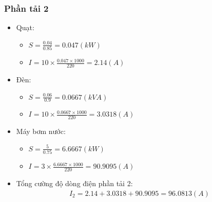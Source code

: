         \subsubsection{Phần tải 2}
            \begin{itemize}
                \item Quạt:
                    \begin{itemize}
                        \item $S = \frac{0.04}{0.85} = 0.047 (kW)$
                        \item $I = 10 \times \frac{0.047 \times 1000}{220} = 2.14 (A)$
                    \end{itemize}
                \item Đèn:
                    \begin{itemize}
                        \item $S = \frac{0.06}{0.9} = 0.0667 (kVA)$
                        \item $I = 10 \times \frac{0.0667 \times 1000}{220} = 3.0318 (A)$
                    \end{itemize}
                \item Máy bơm nước:
                    \begin{itemize}
                        \item $S = \frac{5}{0.75} = 6.6667 (kW)$
                        \item $I = 3 \times \frac{6.6667 \times 1000}{220} = 90.9095 (A)$
                    \end{itemize}
                \item Tổng cường độ dòng điện phần tải 2:
                    \begin{align*}
                        I_{2} = 2.14 + 3.0318 + 90.9095 = 96.0813 (A)
                    \end{align*}
            \end{itemize}

